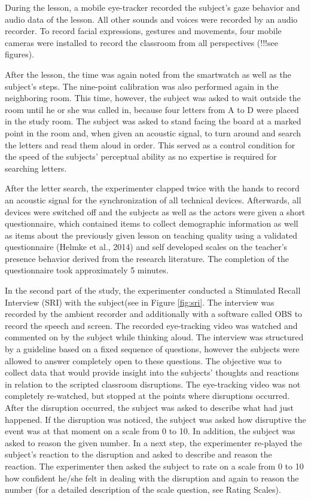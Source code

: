 \documentclass[
  man]{apa6}
\begin{document}
During the lesson, a mobile eye-tracker recorded the subject's gaze behavior and audio data of the lesson. All other sounds and voices were recorded by an audio recorder. To record facial expressions, gestures and movements, four mobile cameras were installed to record the classroom from all perspectives (!!!see figures).

After the lesson, the time was again noted from the smartwatch as well as the subject's steps. The nine-point calibration was also performed again in the neighboring room. This time, however, the subject was asked to wait outside the room until he or she was called in, because four letters from A to D were placed in the study room. The subject was asked to stand facing the board at a marked point in the room and, when given an acoustic signal, to turn around and search the letters and read them aloud in order. This served as a control condition for the speed of the subjects' perceptual ability as no expertise is required for searching letters.

After the letter search, the experimenter clapped twice with the hands to record an acoustic signal for the synchronization of all technical devices. Afterwards, all devices were switched off and the subjects as well as the actors were given a short questionnaire, which contained items to collect demographic information as well as items about the previously given lesson on teaching quality using a validated questionnaire (Helmke et al., 2014) and self developed scales on the teacher's presence behavior derived from the research literature. The completion of the questionnaire took approximately 5 minutes.

In the second part of the study, the experimenter conducted a Stimulated Recall Interview (SRI) with the subject(see in Figure \ref{fig:sri}. The interview was recorded by the ambient recorder and additionally with a software called OBS to record the speech and screen. The recorded eye-tracking video was watched and commented on by the subject while thinking aloud. The interview was structured by a guideline based on a fixed sequence of questions, however the subjects were allowed to answer completely open to these questions. The objective was to collect data that would provide insight into the subjects' thoughts and reactions in relation to the scripted classroom disruptions. The eye-tracking video was not completely re-watched, but stopped at the points where disruptions occurred. After the disruption occurred, the subject was asked to describe what had just happened. If the disruption was noticed, the subject was asked how disruptive the event was at that moment on a scale from 0 to 10. In addition, the subject was asked to reason the given number. In a next step, the experimenter re-played the subject's reaction to the disruption and asked to describe and reason the reaction. The experimenter then asked the subject to rate on a scale from 0 to 10 how confident he/she felt in dealing with the disruption and again to reason the number (for a detailed description of the scale question, see Rating Scales).
\end{document}
